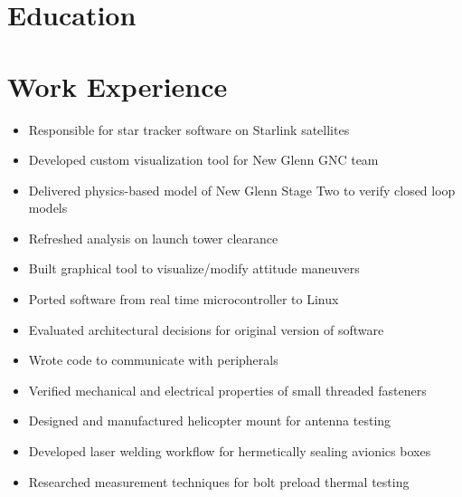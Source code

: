 \documentclass{resume}
\begin{document}

\section{Education}

\section{Work Experience}
\begin{itemize}
    \item Responsible for star tracker software on Starlink satellites
\end{itemize}
\begin{itemize}
    \item Developed custom visualization tool for New Glenn GNC team
    \item Delivered physics-based model of New Glenn Stage Two to verify closed loop models
    \item Refreshed analysis on launch tower clearance
    \item Built graphical tool to visualize/modify attitude maneuvers
    \item Ported software from real time microcontroller to Linux
    \item Evaluated architectural decisions for original version of software
    \item Wrote code to communicate with peripherals
\end{itemize}
\begin{itemize}
    \item Verified mechanical and electrical properties of small threaded fasteners
    \item Designed and manufactured helicopter mount for antenna testing
    \item Developed laser welding workflow for hermetically sealing avionics boxes
    \item Researched measurement techniques for bolt preload thermal testing
\end{itemize}
\end{document}
